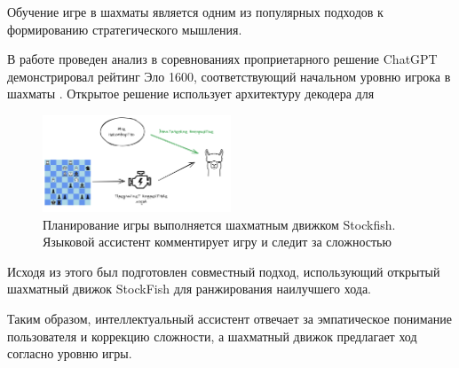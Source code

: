 Обучение игре в шахматы является одним из популярных подходов к формированию стратегического мышления.

В работе \cite{Adam2024} проведен анализ в соревнованиях проприетарного решение ChatGPT демонстрировал рейтинг Эло 1600,
соответствующий начальном уровню игрока в шахматы \cite{elo1967proposed}. Открытое решение \cite{feng2024chessgpt} использует архитектуру декодера для 


\begin{figure}[h]
    \centering
    \includegraphics[width=0.5\textwidth]{assets/work/games/llama-chess.excalidraw.png}
    \caption{Планирование игры выполняется шахматным движком Stockfish. Языковой ассистент комментирует игру и следит за сложностью}
    \label{chess}
\end{figure}



Исходя из этого был подготовлен совместный подход, 
использующий открытый шахматный движок StockFish \cite{acher2016large} для ранжирования наилучшего хода. 

Таким образом, интеллектуальный ассистент отвечает за эмпатическое понимание пользователя и коррекцию сложности,
а шахматный движок предлагает ход согласно уровню игры.





